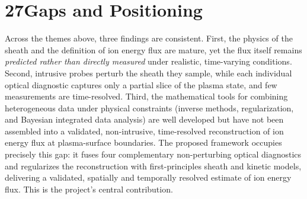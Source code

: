 \documentclass[11pt,a4paper]{article}
\begin{document}
\section*{27\quad Gaps and Positioning}
Across the themes above, three findings are consistent. First, the physics of the sheath and the definition of ion energy flux are mature, yet the flux itself remains \emph{predicted rather than directly measured} under realistic, time-varying conditions. Second, intrusive probes perturb the sheath they sample, while each individual optical diagnostic captures only a partial slice of the plasma state, and few measurements are time-resolved. Third, the mathematical tools for combining heterogeneous data under physical constraints (inverse methods, regularization, and Bayesian integrated data analysis) are well developed but have not been assembled into a validated, non-intrusive, time-resolved reconstruction of ion energy flux at plasma-surface boundaries. The proposed framework occupies precisely this gap: it fuses four complementary non-perturbing optical diagnostics and regularizes the reconstruction with first-principles sheath and kinetic models, delivering a validated, spatially and temporally resolved estimate of ion energy flux. This is the project's central contribution.
\end{document}
